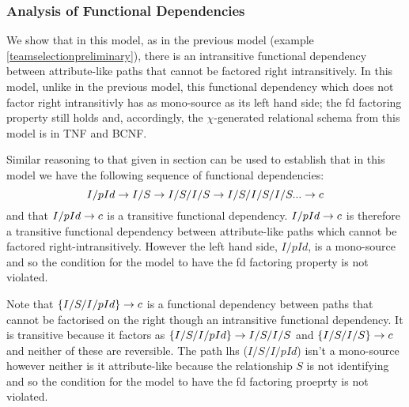 \subsubsection{Analysis of Functional Dependencies}
 
We show that in this model, as in the previous model (example \ref{teamselectionpreliminary}),  there is 
 an intransitive functional dependency between attribute-like paths that cannot be factored right intransitively.
In this model, unlike in the previous model, this functional dependency which does not factor right intransitivly has as mono-source as its left hand side; the fd factoring property still holds and, accordingly, the $\chi$-generated relational schema from this model is in TNF and BCNF.


Similar reasoning to that given in section  can be used to establish that 
in this model we have the following sequence of functional dependencies:
\begin{equation}
I/pId \rightarrow I/S \rightarrow I/S/I/S \rightarrow I/S/I/S/I/S ... \rightarrow c
\end{equation}
and that $I/pId \rightarrow c$ is a transitive functional dependency.  $I/pId \rightarrow c$ is therefore a transitive functional dependency between attribute-like paths which cannot
be factored right-intransitively. However  the left hand side, $I/pId$, is a mono-source and so the condition for the model to have the fd factoring property is not violated.

Note that $\left\{I/S/I/pId\right\} \rightarrow c$ is a functional dependency between  paths that cannot be factorised on the right though an intransitive functional dependency. 
 It is transitive because it factors as $\left\{I/S/I/pId\right\} \rightarrow I/S/I/S$ and $\left\{I/S/I/S\right\} \rightarrow c$ and neither of these are reversible. The path lhs ($I/S/I/pId$) isn't a mono-source 
however neither is it attribute-like  because the relationship $S$ is not identifying and so the condition for the model to have the fd factoring proeprty is not violated.

